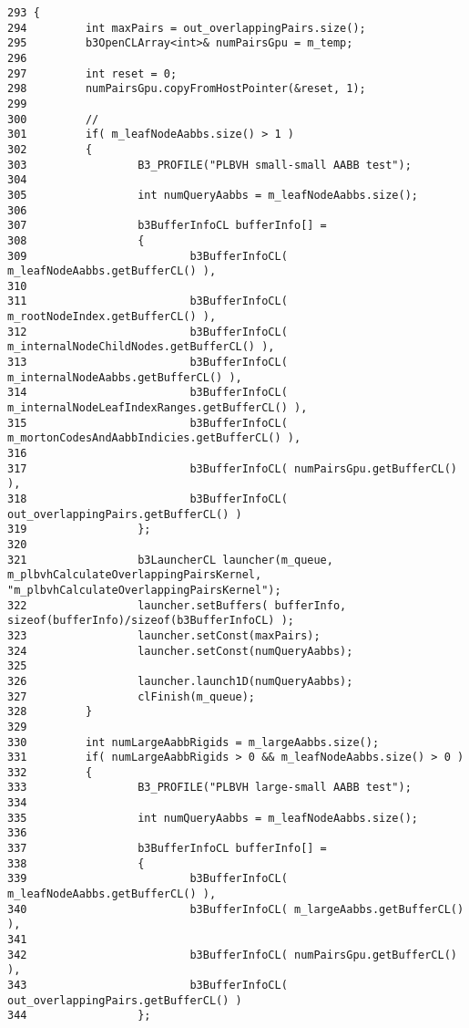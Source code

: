 \begin{Code}\begin{verbatim}293 {
294         int maxPairs = out_overlappingPairs.size();
295         b3OpenCLArray<int>& numPairsGpu = m_temp;
296         
297         int reset = 0;
298         numPairsGpu.copyFromHostPointer(&reset, 1);
299         
300         //
301         if( m_leafNodeAabbs.size() > 1 )
302         {
303                 B3_PROFILE("PLBVH small-small AABB test");
304         
305                 int numQueryAabbs = m_leafNodeAabbs.size();
306                 
307                 b3BufferInfoCL bufferInfo[] = 
308                 {
309                         b3BufferInfoCL( m_leafNodeAabbs.getBufferCL() ),
310                         
311                         b3BufferInfoCL( m_rootNodeIndex.getBufferCL() ),
312                         b3BufferInfoCL( m_internalNodeChildNodes.getBufferCL() ),
313                         b3BufferInfoCL( m_internalNodeAabbs.getBufferCL() ),
314                         b3BufferInfoCL( m_internalNodeLeafIndexRanges.getBufferCL() ),
315                         b3BufferInfoCL( m_mortonCodesAndAabbIndicies.getBufferCL() ),
316                         
317                         b3BufferInfoCL( numPairsGpu.getBufferCL() ),
318                         b3BufferInfoCL( out_overlappingPairs.getBufferCL() )
319                 };
320                 
321                 b3LauncherCL launcher(m_queue, m_plbvhCalculateOverlappingPairsKernel, "m_plbvhCalculateOverlappingPairsKernel");
322                 launcher.setBuffers( bufferInfo, sizeof(bufferInfo)/sizeof(b3BufferInfoCL) );
323                 launcher.setConst(maxPairs);
324                 launcher.setConst(numQueryAabbs);
325                 
326                 launcher.launch1D(numQueryAabbs);
327                 clFinish(m_queue);
328         }
329         
330         int numLargeAabbRigids = m_largeAabbs.size();
331         if( numLargeAabbRigids > 0 && m_leafNodeAabbs.size() > 0 )
332         {
333                 B3_PROFILE("PLBVH large-small AABB test");
334         
335                 int numQueryAabbs = m_leafNodeAabbs.size();
336                 
337                 b3BufferInfoCL bufferInfo[] = 
338                 {
339                         b3BufferInfoCL( m_leafNodeAabbs.getBufferCL() ),
340                         b3BufferInfoCL( m_largeAabbs.getBufferCL() ),
341                         
342                         b3BufferInfoCL( numPairsGpu.getBufferCL() ),
343                         b3BufferInfoCL( out_overlappingPairs.getBufferCL() )
344                 };

\end{verbatim}
\end{Code}
